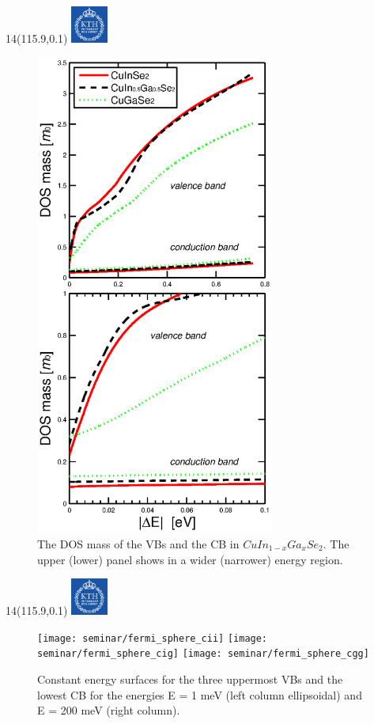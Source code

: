 \documentclass[]{beamer}
\newcommand{\MyLogo}{%
\begin{textblock}{14}(115.9,0.1)
  \includegraphics[width=1.22cm]{kth_rgb}
 \end{textblock}
}
\begin{document}
\begin{frame}
\MyLogo
\begin{figure}\label{dosmass}
  \begin{minipage}{0.5\textwidth} 
    \includegraphics[width=0.7\textwidth]{seminar/dos_mass}
  \end{minipage}%
  \begin{minipage}{0.5\textwidth}
    \caption{  The DOS mass of the VBs and the CB in $CuIn_{1-x}Ga_{x}Se_{2}$. The upper (lower) panel shows in a wider (narrower) energy region.}
  \end{minipage}
\end{figure}
\end{frame}




\begin{frame}
\MyLogo
\begin{figure}[H]
    \begin{center}
            \texttt{[image: seminar/fermi\_sphere\_cii]}
            \texttt{[image: seminar/fermi\_sphere\_cig]}
            \texttt{[image: seminar/fermi\_sphere\_cgg]}
     \end{center}
    \caption{Constant energy surfaces for the three uppermost VBs and the lowest CB for the energies E = 1 meV (left column ellipsoidal) and E = 200 meV (right column). }
\end{figure}
\end{frame}
\end{document}
